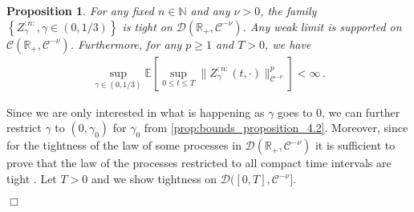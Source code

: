 \documentclass{report}
\newcommand{\RR}{\mathbb{R}}
\newtheorem{proposition}[theorem]{Proposition}
\renewenvironment{proof}{{\bf \emph{Proof (idea):} }}{\hfill $\Box$ \\}
\theoremstyle{remark}
\theoremstyle{definition}
\begin{document}
\begin{proposition}
  \label{prop:Z_is_tight}
  For any fixed $n\in \mathbb{N}$ and any $\nu > 0$, the family $\left\{Z^{:n:}_{\gamma}, \gamma \in (0, 1/3) \right\}$ is tight on $\mathcal{D}(\mathbb{R}_+, \mathcal{C}^{-\nu})$. Any weak limit is supported on $\mathcal{C}(\mathbb{R}_+, \mathcal{C}^{-\nu})$. Furthermore, for any $p \ge 1$ and $T > 0$, we have 
  \begin{align}
    \label{eq:uniform_bound_stuff}
    \sup_{\gamma \in (0, 1/3)} \mathbb{E}\left[ \sup_{0 \le t \le T} \lVert Z^{:n:}_\gamma(t, \cdot)\rVert^p_{\mathcal{C}^{-\nu}} \right] < \infty\,.
  \end{align}
\end{proposition}
\begin{proof}
  Since we are only interested in what is happening as $\gamma$ goes to $0$, we can further restrict $\gamma$ to $(0, \gamma_0)$ for $\gamma_0$ from \autoref{prop:bounds_proposition_4.2}. Moreover, since for the tightness of the law of some processes in $\mathcal{D}(\RR_+,\mathcal{C}^{-\nu})$ it is sufficient to prove that the law of the processes restricted to all compact time intervals are tight \cite{mourrat2015convergencetwodimensionaldynamicisingkac}. Let $T > 0$ and we show tightness on $\mathcal{D}([0, T], \mathcal{C}^{-\nu}]$.


\end{proof}
\end{document}
